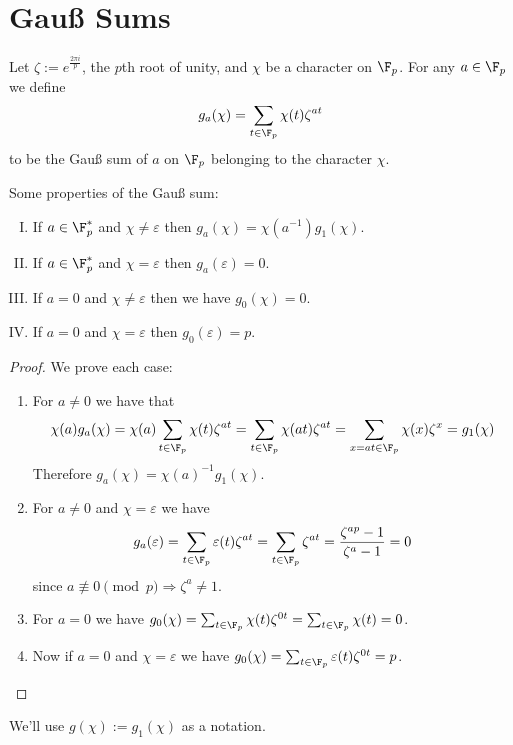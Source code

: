 \section{Gau{\ss} Sums}

\begin{definition}
   Let \(\zeta := e^{\frac{2\pi i}{p}}\), the \(p\)th root of unity, and
   \(\chi\) be a character on \(\F_p\). For any \(a \in \F_p\) we define 
   \[
      g_a(\chi) = \sum_{t \in \F_p} \chi(t) \zeta^{at}
   \] 
   to be the Gau{\ss} sum of \(a\) on \(\F_p\) belonging to the character
   \(\chi\).
\end{definition}

\begin{proposition}
   Some properties of the Gau{\ss} sum:
   \begin{enumerate}[I.]
      \item If \(a \in \F_p^\ast\) and \(\chi \neq \varepsilon\) then
         \(g_a(\chi) = \chi(a^{-1})g_1(\chi)\).
      \item If \(a \in \F_p^\ast\) and \(\chi = \varepsilon\) then
         \(g_a(\varepsilon) = 0\).
      \item If \(a = 0\) and  \(\chi \neq  \varepsilon\) then  we have
         \(g_0(\chi) = 0\).
      \item  If \(a = 0\) and \(\chi = \varepsilon\) then \(g_0(\varepsilon) =
         p\).
   \end{enumerate}
\end{proposition}

\begin{proof}
   We prove each case:
   \begin{enumerate}
      \item For \(a \neq  0\) we have that 
         \[
            \chi(a)g_a(\chi) = \chi(a) \sum_{t \in \F_p} \chi(t) \zeta^{at}
            = \sum_{t \in \F_p} \chi(at) \zeta^{at} 
            = \sum_{x = at \in \F_p} \chi(x) \zeta^x 
            = g_1(\chi) 
         \] 
         Therefore \(g_a(\chi) = \chi(a)^{-1} g_1(\chi)\).
      \item For \(a \neq  0\) and \(\chi = \varepsilon\) we have 
         \[
            g_a(\varepsilon) = \sum_{t \in \F_p} \varepsilon(t)\zeta^{at} =
            \sum_{t \in \F_p}\zeta^{at} = \frac{\zeta^{ap} - 1}{\zeta^a - 1} = 0
         \] 
         since \(a \not\equiv 0 \pmod{p} \Rightarrow \zeta^{a} \neq 1\).
      \item For \(a = 0\) we have  \(g_0(\chi) = \sum_{t \in \F_p} \chi(t)
         \zeta^{0t} = \sum_{t \in \F_p} \chi(t) = 0\).
      \item Now if \(a = 0\) and \(\chi = \varepsilon\) we have \(g_0(\chi) =
         \sum_{t \in \F_p} \varepsilon(t) \zeta^{0t} = p\).
   \end{enumerate}
\end{proof}

\begin{remark}
   We'll use \(g(\chi) := g_1(\chi)\) as a notation.
\end{remark}
